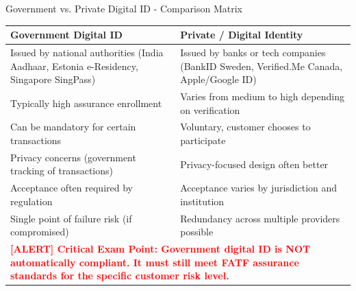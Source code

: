 \documentclass[11pt,a4paper]{beamer}
\newcommand{\redflag}[1]{\textcolor{red}{\textbf{[ALERT] #1}}}
\begin{document}
	\begin{frame}{Government vs. Private Digital ID - Comparison Matrix}
		\begin{longtable}{p{}|p{}}
			\hline
			\rowcolor{lightgray}
			\textbf{Government Digital ID} & \textbf{Private / Digital Identity} \\
			\hline
			Issued by national authorities (India Aadhaar, Estonia e-Residency, Singapore SingPass) & Issued by banks or tech companies (BankID Sweden, Verified.Me Canada, Apple/Google ID) \\
			\hline
			Typically high assurance enrollment & Varies from medium to high depending on verification \\
			\hline
			Can be mandatory for certain transactions & Voluntary, customer chooses to participate \\
			\hline
			Privacy concerns (government tracking of transactions) & Privacy-focused design often better \\
			\hline
			Acceptance often required by regulation & Acceptance varies by jurisdiction and institution \\
			\hline
			Single point of failure risk (if compromised) & Redundancy across multiple providers possible \\
			\hline
			\multicolumn{2}{p{0.96\textwidth}}{\redflag{Critical Exam Point: Government digital ID is NOT automatically compliant. It must still meet FATF assurance standards for the specific customer risk level.}} \\
			\hline
		\end{longtable}
	\end{frame}
	
\end{document}
